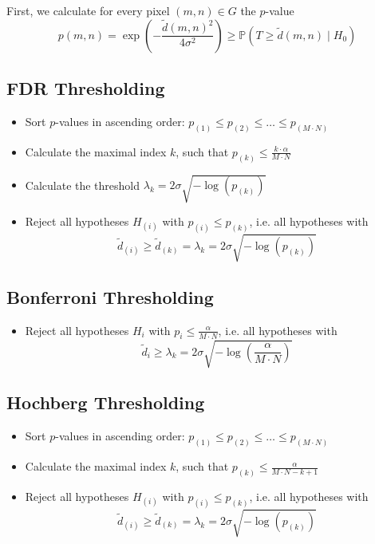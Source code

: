 \documentclass{beamer}
\begin{document}
\begin{frame}
	First, we calculate for every pixel $(m, n) \in G$ the $p$-value
	\begin{equation*}
		p(m, n) = \exp \left( - \frac{\tilde{d}(m, n)^2}{4 \sigma^2} \right) \geq \mathbb{P}(T \geq \tilde{d}(m, n) \mid H_0)
	\end{equation*}
\end{frame}

\begin{frame}
	\subsection{FDR Thresholding}
	
	\begin{itemize}
		\item Sort $p$-values in ascending order: $p_{(1)} \leq p_{(2)} \leq \dots \leq p_{(M \cdot N)}$
		\item Calculate the maximal index $k$, such that $p_{(k)} \leq \frac{k \cdot \alpha}{M \cdot N}$
		\item Calculate the threshold $\lambda_{k} = 2 \sigma \sqrt{- \log(p_{(k)})}$
		\item Reject all hypotheses $H_{(i)}$ with $p_{(i)} \leq p_{(k)}$, i.e. all hypotheses with $$\tilde{d}_{(i)} \geq \tilde{d}_{(k)} = \lambda_{k} = 2 \sigma \sqrt{- \log(p_{(k)})}$$
	\end{itemize}
\end{frame}

\begin{frame}
	\subsection{Bonferroni Thresholding}
	
	\begin{itemize}
		\item Reject all hypotheses $H_{i}$ with $p_{i} \leq \frac{\alpha}{M \cdot N}$, i.e. all hypotheses with $$\tilde{d}_{i} \geq \lambda_k = 2 \sigma \sqrt{- \log \left( \frac{\alpha}{M \cdot N} \right)}$$
	\end{itemize}
\end{frame}

\begin{frame}
	\subsection{Hochberg Thresholding}
	
	\begin{itemize}
		\item Sort $p$-values in ascending order: $p_{(1)} \leq p_{(2)} \leq \dots \leq p_{(M \cdot N)}$
		\item Calculate the maximal index $k$, such that $p_{(k)} \leq \frac{\alpha}{M \cdot N - k + 1}$
		\item Reject all hypotheses $H_{(i)}$ with $p_{(i)} \leq p_{(k)}$, i.e. all hypotheses with $$\tilde{d}_{(i)} \geq \tilde{d}_{(k)} = \lambda_{k} = 2 \sigma \sqrt{- \log(p_{(k)})}$$
	\end{itemize}
\end{frame}
\end{document}

